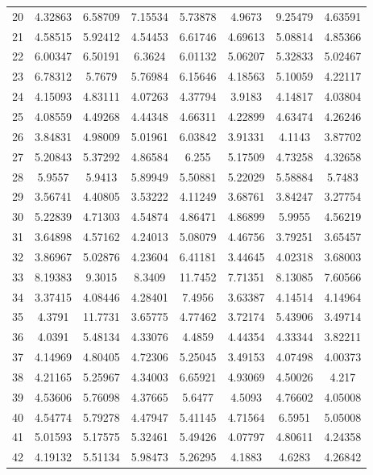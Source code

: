 \begin{center}
\begin{longtable}{cccccccc}
20 & 4.32863 & 6.58709 & 7.15534 & 5.73878 & 4.9673 & 9.25479 & 4.63591\\
21 & 4.58515 & 5.92412 & 4.54453 & 6.61746 & 4.69613 & 5.08814 & 4.85366\\
22 & 6.00347 & 6.50191 & 6.3624 & 6.01132 & 5.06207 & 5.32833 & 5.02467\\
23 & 6.78312 & 5.7679 & 5.76984 & 6.15646 & 4.18563 & 5.10059 & 4.22117\\
24 & 4.15093 & 4.83111 & 4.07263 & 4.37794 & 3.9183 & 4.14817 & 4.03804\\
25 & 4.08559 & 4.49268 & 4.44348 & 4.66311 & 4.22899 & 4.63474 & 4.26246\\
26 & 3.84831 & 4.98009 & 5.01961 & 6.03842 & 3.91331 & 4.1143 & 3.87702\\
27 & 5.20843 & 5.37292 & 4.86584 & 6.255 & 5.17509 & 4.73258 & 4.32658\\
28 & 5.9557 & 5.9413 & 5.89949 & 5.50881 & 5.22029 & 5.58884 & 5.7483\\
29 & 3.56741 & 4.40805 & 3.53222 & 4.11249 & 3.68761 & 3.84247 & 3.27754\\
30 & 5.22839 & 4.71303 & 4.54874 & 4.86471 & 4.86899 & 5.9955 & 4.56219\\
31 & 3.64898 & 4.57162 & 4.24013 & 5.08079 & 4.46756 & 3.79251 & 3.65457\\
32 & 3.86967 & 5.02876 & 4.23604 & 6.41181 & 3.44645 & 4.02318 & 3.68003\\
33 & 8.19383 & 9.3015 & 8.3409 & 11.7452 & 7.71351 & 8.13085 & 7.60566\\
34 & 3.37415 & 4.08446 & 4.28401 & 7.4956 & 3.63387 & 4.14514 & 4.14964\\
35 & 4.3791 & 11.7731 & 3.65775 & 4.77462 & 3.72174 & 5.43906 & 3.49714\\
36 & 4.0391 & 5.48134 & 4.33076 & 4.4859 & 4.44354 & 4.33344 & 3.82211\\
37 & 4.14969 & 4.80405 & 4.72306 & 5.25045 & 3.49153 & 4.07498 & 4.00373\\
38 & 4.21165 & 5.25967 & 4.34003 & 6.65921 & 4.93069 & 4.50026 & 4.217\\
39 & 4.53606 & 5.76098 & 4.37665 & 5.6477 & 4.5093 & 4.76602 & 4.05008\\
40 & 4.54774 & 5.79278 & 4.47947 & 5.41145 & 4.71564 & 6.5951 & 5.05008\\
41 & 5.01593 & 5.17575 & 5.32461 & 5.49426 & 4.07797 & 4.80611 & 4.24358\\
42 & 4.19132 & 5.51134 & 5.98473 & 5.26295 & 4.1883 & 4.6283 & 4.26842\\

\end{longtable}
\end{center}
